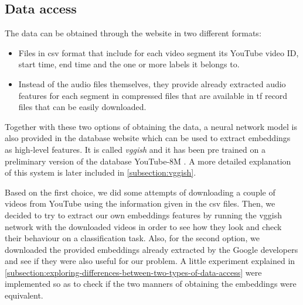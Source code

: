 %
%	
%	

\subsection{Data access}
\label{subsection:data-access}

	The data can be obtained through the website \cite{SoundUnderstandinggroup2017} in two different formats:

	\begin{itemize}
		\item Files in \acrshort{csv} format that include for each video segment its YouTube video ID, start time, end time and the one or more labels it belongs to. 
		\item Instead of the audio files themselves, they provide already extracted audio features for each segment in compressed files that are available in \acrfull{tf} \cite{GoogleResearch2015} record files that can be easily downloaded.
	\end{itemize}
	
	Together with these two options of obtaining the data, a neural network model is also provided in the database website which can be used to extract embeddings as high-level features. It is called \textit{\acrshort{vgg}ish} \cite{Hershey2017} and it has been pre trained on a preliminary version of the database YouTube-8M \cite{Abu-El-Haija2016}. A more detailed explanation of this system is later included in \ref{subsection:vggish}.
	
	Based on the first choice, we did some attempts of downloading a couple of videos from YouTube using the information given in the \acrshort{csv} files. Then, we decided to try to extract our own embeddings features by running the \acrshort{vgg}ish network with the downloaded videos in order to see how they look and check their behaviour on a classification task. Also, for the second option, we downloaded the provided embeddings already extracted by the Google developers and see if they were also useful for our problem. A little experiment explained in \ref{subsection:exploring-differences-between-two-types-of-data-access} were implemented so as to check if the two manners of obtaining the embeddings were equivalent.

